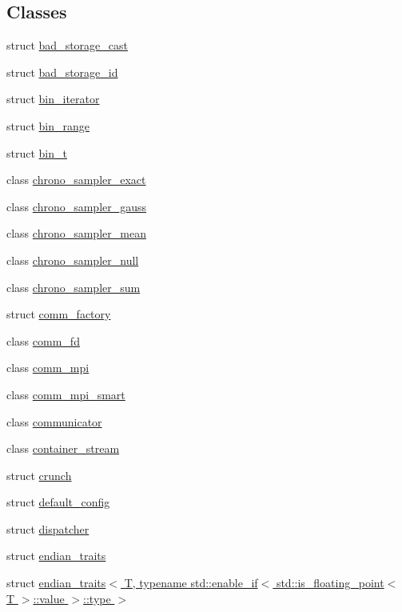 \subsection*{Classes}
\begin{DoxyCompactItemize}
\item 
struct \hyperlink{structmui_1_1bad__storage__cast}{bad\+\_\+storage\+\_\+cast}
\item 
struct \hyperlink{structmui_1_1bad__storage__id}{bad\+\_\+storage\+\_\+id}
\item 
struct \hyperlink{structmui_1_1bin__iterator}{bin\+\_\+iterator}
\item 
struct \hyperlink{structmui_1_1bin__range}{bin\+\_\+range}
\item 
struct \hyperlink{structmui_1_1bin__t}{bin\+\_\+t}
\item 
class \hyperlink{classmui_1_1chrono__sampler__exact}{chrono\+\_\+sampler\+\_\+exact}
\item 
class \hyperlink{classmui_1_1chrono__sampler__gauss}{chrono\+\_\+sampler\+\_\+gauss}
\item 
class \hyperlink{classmui_1_1chrono__sampler__mean}{chrono\+\_\+sampler\+\_\+mean}
\item 
class \hyperlink{classmui_1_1chrono__sampler__null}{chrono\+\_\+sampler\+\_\+null}
\item 
class \hyperlink{classmui_1_1chrono__sampler__sum}{chrono\+\_\+sampler\+\_\+sum}
\item 
struct \hyperlink{structmui_1_1comm__factory}{comm\+\_\+factory}
\item 
class \hyperlink{classmui_1_1comm__fd}{comm\+\_\+fd}
\item 
class \hyperlink{classmui_1_1comm__mpi}{comm\+\_\+mpi}
\item 
class \hyperlink{classmui_1_1comm__mpi__smart}{comm\+\_\+mpi\+\_\+smart}
\item 
class \hyperlink{classmui_1_1communicator}{communicator}
\item 
class \hyperlink{classmui_1_1container__stream}{container\+\_\+stream}
\item 
struct \hyperlink{structmui_1_1crunch}{crunch}
\item 
struct \hyperlink{structmui_1_1default__config}{default\+\_\+config}
\item 
struct \hyperlink{structmui_1_1dispatcher}{dispatcher}
\item 
struct \hyperlink{structmui_1_1endian__traits}{endian\+\_\+traits}
\item 
struct \hyperlink{structmui_1_1endian__traits_3_01_t_00_01typename_01std_1_1enable__if_3_01std_1_1is__floating__po2204fe17b69811056c26bb26c4197e1a}{endian\+\_\+traits$<$ T, typename std\+::enable\+\_\+if$<$ std\+::is\+\_\+floating\+\_\+point$<$ T $>$\+::value $>$\+::type $>$}

\end{DoxyCompactItemize}
